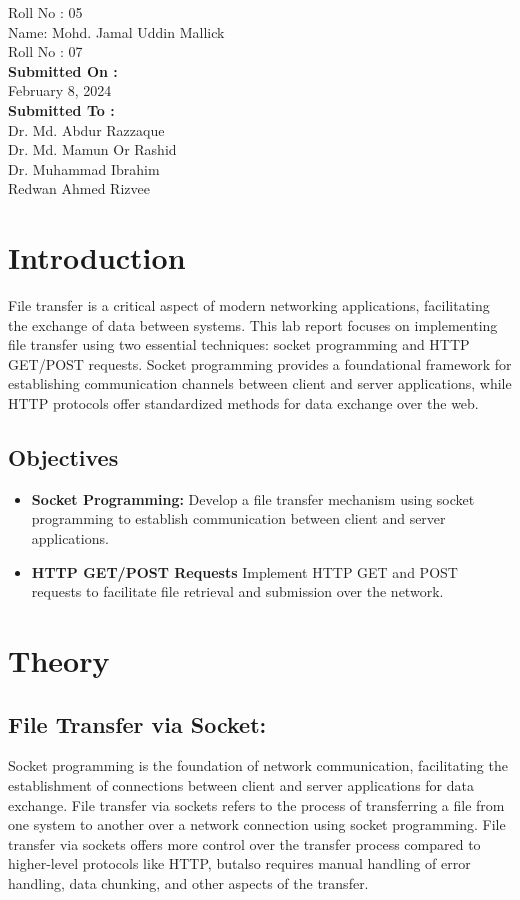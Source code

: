 \documentclass[11pt]{article}
\begin{document}
\begin{titlepage}
\begin{center}
\begin{large}
            Roll No : 05\\[12pt]
            Name: Mohd. Jamal Uddin Mallick\\[8pt]
            Roll No : 07\\[12pt]
            \textbf{Submitted On : \\[12pt]}
            February 8, 2024\\[20pt]
            \textbf{Submitted To :\\[12pt]}
            Dr. Md. Abdur Razzaque\\[12pt]
            Dr. Md. Mamun Or Rashid\\[12pt]
            Dr. Muhammad Ibrahim\\[12pt]
            Redwan Ahmed Rizvee
        \end{large}
\end{center}
\end{titlepage}

\section{Introduction}
File transfer is a critical aspect of modern networking applications, facilitating the exchange of data between systems. This lab report focuses on implementing file transfer using two essential techniques: socket programming and HTTP GET/POST requests. Socket programming provides a foundational framework for establishing communication channels between client and server applications, while HTTP protocols offer standardized methods for data exchange over the web.

\subsection{Objectives}
\begin{itemize}
    \item \textbf{Socket Programming: } Develop a file transfer mechanism using socket programming to establish communication between client and server applications.
    \item \textbf{HTTP GET/POST Requests} Implement HTTP GET and POST requests to facilitate file retrieval and submission over the network.
\end{itemize}
\section{Theory}
\subsection{File Transfer via Socket:}
Socket programming is the foundation of network communication, facilitating the establishment of connections between client and server applications for data exchange. File transfer via sockets refers to the process of transferring a file from one system to another over
a network connection using socket programming. File transfer via sockets offers more control over the transfer process compared to higher-level
protocols like HTTP, butalso requires manual handling of error handling, data chunking, and other
aspects of the transfer.
\end{document}
